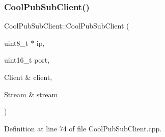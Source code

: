 \subsubsection{\texorpdfstring{Cool\+Pub\+Sub\+Client()}{CoolPubSubClient()}\hspace{0.1cm}{\footnotesize\ttfamily [8/14]}}
{\footnotesize\ttfamily Cool\+Pub\+Sub\+Client\+::\+Cool\+Pub\+Sub\+Client (\begin{DoxyParamCaption}\item[{uint8\+\_\+t $\ast$}]{ip,  }\item[{uint16\+\_\+t}]{port,  }\item[{Client \&}]{client,  }\item[{Stream \&}]{stream }\end{DoxyParamCaption})}



Definition at line 74 of file Cool\+Pub\+Sub\+Client.\+cpp.


